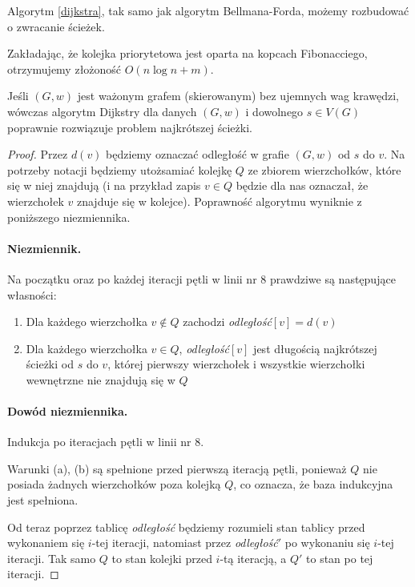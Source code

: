 Algorytm \ref{dijkstra}, tak samo jak algorytm Bellmana-Forda,
możemy rozbudować o zwracanie ścieżek.

Zakładając, że kolejka priorytetowa jest oparta na kopcach 
Fibonacciego, otrzymujemy złożoność $O(n\log n + m)$. 

\begin{theorem}
	Jeśli $(G, w)$ jest ważonym grafem (skierowanym)
	bez ujemnych wag krawędzi, wówczas algorytm Dijkstry
	dla danych $(G, w)$ i dowolnego $s \in V(G)$
	poprawnie rozwiązuje problem najkrótszej ścieżki.
	
	\begin{proof}
		Przez $d(v)$ będziemy oznaczać odległość w 
		grafie $(G, w)$
		od $s$ do $v$. Na potrzeby notacji 
		będziemy utożsamiać
		kolejkę $Q$ ze zbiorem wierzchołków, które
		się w niej znajdują (i na przykład zapis $v \in Q$ 
		będzie dla nas oznaczał, że
		wierzchołek $v$ znajduje się w kolejce).
		Poprawność algorytmu wyniknie z poniższego niezmiennika.
		
		\paragraph{Niezmiennik.} Na początku oraz po 
		każdej iteracji pętli w linii nr 8 prawdziwe są 
		następujące własności:
		\begin{enumerate}[label=(\alph*)]
			\item Dla każdego wierzchołka $v \not \in Q$
			zachodzi \textit{odległość}$[v] = d(v)$ 
			\item Dla każdego wierzchołka $v \in Q$,
			\textit{odległość}$[v]$ jest długością najkrótszej
			ścieżki od $s$ do $v$, której pierwszy wierzchołek 
			i wszystkie wierzchołki wewnętrzne nie znajdują się 
			w $Q$ 
		\end{enumerate}
		\paragraph{Dowód niezmiennika.} Indukcja po iteracjach
		pętli w linii nr 8.
		
		Warunki (a), (b) są spełnione przed pierwszą iteracją
		pętli, ponieważ $Q$
		nie posiada żadnych wierzchołków poza 
		kolejką $Q$, co oznacza, że baza indukcyjna jest spełniona.
		
		Od teraz poprzez tablicę \textit{odległość} będziemy rozumieli 
		stan tablicy przed wykonaniem się $i$-tej iteracji, 
		natomiast przez \textit{odległość}$'$ po wykonaniu się $i$-tej iteracji.
		Tak samo $Q$ to stan kolejki przed $i$-tą iteracją,
		a $Q'$ to stan po tej iteracji. 
		

\end{proof}
\end{theorem}
